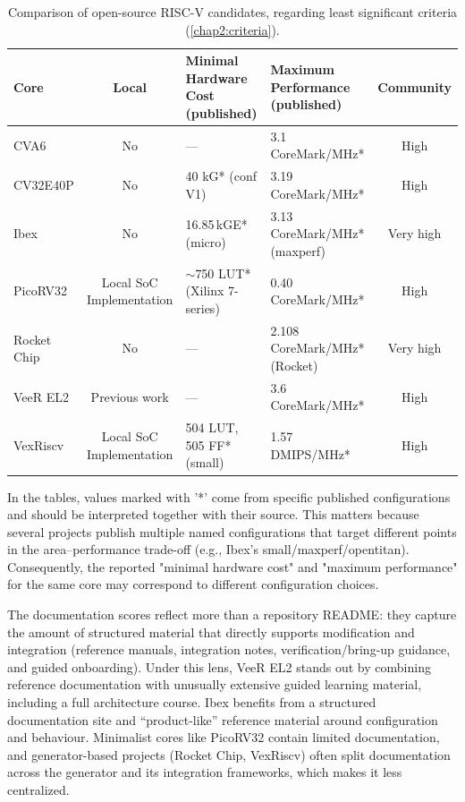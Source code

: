 \begin{table}[H]
\centering
\scriptsize
\setlength{\tabcolsep}{3.2pt}
\renewcommand{\arraystretch}{1.18}
\begin{tabularx}{\textwidth}{|l|c|X|X|c|}
\hline
Core &
Local &
Minimal Hardware Cost (published) &
Maximum Performance (published) &
Community \\
\hline
\hline
CVA6 &
No &
--- &
3.1\,CoreMark/MHz* \cite{CVA6_maxperf} &
High \\
\hline
CV32E40P &
No &
40 kG* (conf V1) \cite{CV32E40P_minhw} &
3.19\,CoreMark/MHz* \cite{CV32E40P_maxperf} &
High \\
\hline
Ibex &
No &
16.85\,kGE* (micro) &
3.13\,CoreMark/MHz* (maxperf) \cite{Ibex_maxperf} &
Very high \\
\hline
PicoRV32 &
Local SoC Implementation &
\(\sim\)750 LUT* (Xilinx 7-series) \cite{PicoRV32_minhw} &
0.40\,CoreMark/MHz* \cite{PicoRV32_maxperf} &
High \\
\hline
Rocket Chip &
No &
--- &
2.108\,CoreMark/MHz* (Rocket) \cite{RocketChip_maxperf} &
Very high \\
\hline
VeeR EL2 &
Previous work &
--- &
3.6\,CoreMark/MHz* \cite{VeeR_EL2_maxperf} &
High \\
\hline
VexRiscv &
Local SoC Implementation &
504 LUT, 505 FF* (small) \cite{VexRiscv_minhw} &
1.57\,DMIPS/MHz* \cite{VexRiscv_maxperf} &
High \\
\hline
\end{tabularx}
\caption{Comparison of open-source RISC-V candidates, regarding least significant criteria (\cref{chap2:criteria}).}
\label{tab:candidate_comparison_fullcriteria_b}
\end{table}


In the tables, values marked with '*' come from specific published configurations and should be interpreted together with their source. This matters because several projects publish multiple named configurations that target different points in the area--performance trade-off (e.g., Ibex’s small/maxperf/opentitan). Consequently, the reported "minimal hardware cost" and "maximum performance" for the same core may correspond to different configuration choices.

The documentation scores reflect more than a repository README: they capture the amount of structured material that directly supports modification and integration (reference manuals, integration notes, verification/bring-up guidance, and guided onboarding). Under this lens, VeeR EL2 stands out by combining reference documentation with unusually extensive guided learning material, including a full architecture course. Ibex benefits from a structured documentation site and “product-like” reference material around configuration and behaviour. Minimalist cores like PicoRV32 contain limited documentation, and generator-based projects (Rocket Chip, VexRiscv) often split documentation across the generator and its integration frameworks, which makes it less centralized.

